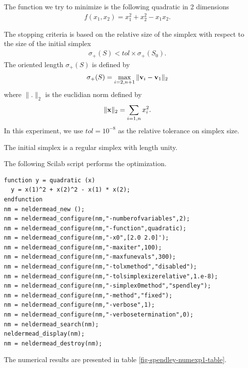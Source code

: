 The function we try to minimize is the following quadratic 
in 2 dimensions 
\begin{eqnarray}
f(x_1,x_2) = x_1^2 + x_2^2 - x_1 x_2.
\end{eqnarray}

The stopping criteria is based on the relative size of the simplex 
with respect to the size of the initial simplex 
\begin{eqnarray}
\sigma_+(S) < tol \times \sigma_+(S_0).
\end{eqnarray}
The oriented length $\sigma_+(S)$ is defined by
\begin{eqnarray}
\sigma_+(S) = \max_{i=2,n+1} \|\mathbf{v}_i - \mathbf{v}_1\|_2
\end{eqnarray}
where $\|.\|_2$ is the euclidian norm defined by 
\begin{eqnarray}
\|\mathbf{x}\|_2 = \sum_{i=1,n}x_i^2.
\end{eqnarray}
In this experiment, we use $tol=10^{-8}$ as the relative tolerance 
on simplex size.

The initial simplex is a regular simplex with length unity.

The following Scilab script performs the optimization.

\lstset{language=scilabscript}
\begin{lstlisting}
function y = quadratic (x)
  y = x(1)^2 + x(2)^2 - x(1) * x(2);
endfunction
nm = neldermead_new ();
nm = neldermead_configure(nm,"-numberofvariables",2);
nm = neldermead_configure(nm,"-function",quadratic);
nm = neldermead_configure(nm,"-x0",[2.0 2.0]');
nm = neldermead_configure(nm,"-maxiter",100);
nm = neldermead_configure(nm,"-maxfunevals",300);
nm = neldermead_configure(nm,"-tolxmethod","disabled");
nm = neldermead_configure(nm,"-tolsimplexizerelative",1.e-8);
nm = neldermead_configure(nm,"-simplex0method","spendley");
nm = neldermead_configure(nm,"-method","fixed");
nm = neldermead_configure(nm,"-verbose",1);
nm = neldermead_configure(nm,"-verbosetermination",0);
nm = neldermead_search(nm);
neldermead_display(nm);
nm = neldermead_destroy(nm);
\end{lstlisting}


The numerical results are presented in table \ref{fig-spendley-numexp1-table}.

